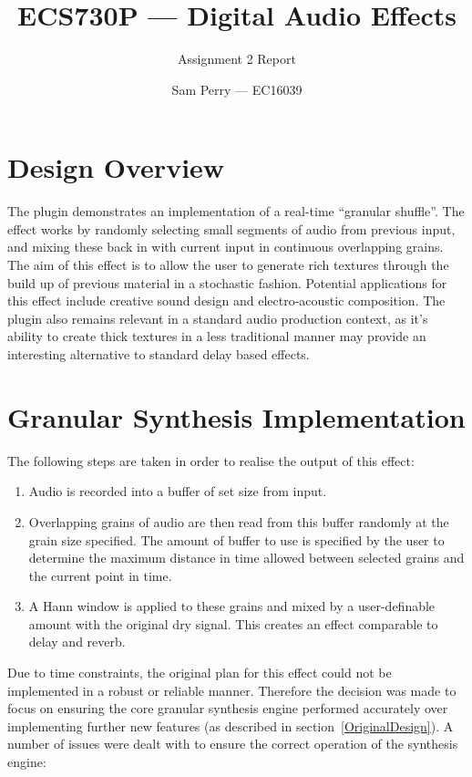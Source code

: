 \documentclass[titlepage]{scrartcl}
\begin{document}
\title{ECS730P --- Digital Audio Effects}
\subtitle{\LARGE{Assignment 2 Report}}
\author{Sam Perry --- EC16039}

\maketitle

\section{Design Overview}
The plugin demonstrates an implementation of a real-time ``granular shuffle''.
The effect works by randomly selecting small segments of audio from previous
input, and mixing these back in with current input in continuous overlapping
grains. The aim of this effect is to allow the user to generate rich textures
through the build up of previous material in a stochastic fashion. Potential
applications for this effect include creative sound design and electro-acoustic
composition. The plugin also remains relevant in a standard audio production
context, as it's ability to create thick textures in a less traditional manner
may provide an interesting alternative to standard delay based effects.

\section{Granular Synthesis Implementation}
The following steps are taken in order to realise the output of this effect:
\begin{enumerate}
    \item Audio is recorded into a buffer of set size from input.
    \item Overlapping grains of audio are then read from this buffer randomly
        at the grain size specified. The amount of buffer to use is specified
        by the user to determine the maximum distance in time allowed between
        selected grains and the current point in time.
    \item A Hann window is applied to these grains and mixed by a
        user-definable amount with the original dry signal. This creates an effect
        comparable to delay and reverb.
\end{enumerate}

Due to time constraints, the original plan for this effect could not be
implemented in a robust or reliable manner. Therefore the decision was made to
focus on ensuring the core granular synthesis engine performed accurately over
implementing further new features (as described in
section~\ref{OriginalDesign}). A number of issues were dealt with to ensure the
correct operation of the synthesis engine:
\end{document}
